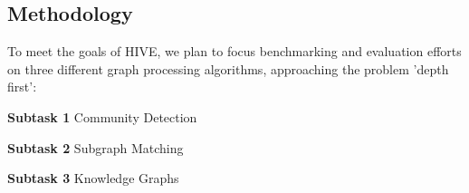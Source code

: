 \documentclass[letterpaper, 10pt]{article}
\begin{document}
\begin{multicols}{2}
    \section{Methodology}\label{section:methodology}
    To meet the goals of HIVE, we plan to focus benchmarking and evaluation efforts on three different graph processing algorithms, approaching the problem 'depth first':
    \newline
    
        \textbf{Subtask 1} Community Detection
        
        \textbf{Subtask 2} Subgraph Matching
        
        \textbf{Subtask 3} Knowledge Graphs


\end{multicols}
\end{document}
